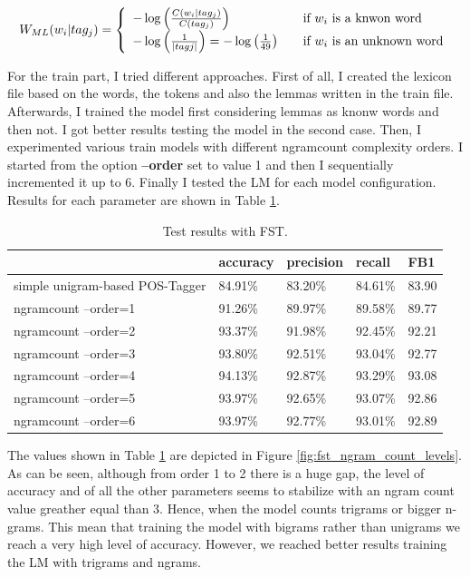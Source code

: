 \documentclass[a4paper,7pt,oneside]{book}
\begin{document}
\[ W_{ML}(w_i | tag_j) = \left\{ 
  \begin{array}{l l}
    - \log \left(\frac{C(w_i | tag_j)}{C(tag_j)}\right) & \quad \text{if $w_i$ is a knwon word}\\
    - \log \left(\frac{1}{|tagj|}\right) = - \log \left(\frac{1}{49}\right) & \quad \text{if $w_i$ is an unknown word}
  \end{array} \right.
 \]
\vspace{0.1cm}

\noindent
For the train part, I tried different approaches. First of all, I created the lexicon file based on the words, the tokens and also the lemmas written in the train file. Afterwards, I trained the model first considering lemmas as knonw words and then not. I got better results testing the model in the second case. Then, I experimented various train models with different ngramcount complexity orders. I started from the option \textbf{--order} set to value 1 and then I sequentially incremented it up to 6. Finally I tested the LM for each model configuration. Results for each parameter are shown in Table \ref{table:fst_results}.

\begin{table}[h!]
\small
	\begin{center}
	\begin{tabular}{|l|l|l|l|l|}
		\cline{2-5}
		\multicolumn{1}{r|}{} & accuracy & precision & recall & FB1 \\ \hline
		simple unigram-based POS-Tagger & 84.91\%  & 83.20\% &  84.61\% & 83.90 \\ \hline
		ngramcount --order=1 & 91.26\% & 89.97\% & 89.58\% & 89.77 \\ \hline
		ngramcount --order=2 & 93.37\% & 91.98\% & 92.45\% & 92.21 \\ \hline
		ngramcount --order=3 & 93.80\% & 92.51\% & 93.04\% & 92.77 \\ \hline \rowcolor{LightCyan}
		ngramcount --order=4 & 94.13\% & 92.87\% & 93.29\% & 93.08 \\ \hline
		ngramcount --order=5 & 93.97\% & 92.65\% & 93.07\% & 92.86 \\ \hline
		ngramcount --order=6 & 93.97\% & 92.77\% & 93.01\% & 92.89 \\ \hline
	\end{tabular}
	\caption{Test results with FST.}
	\label{table:fst_results}
	\end{center}
\end{table}

\noindent
The values shown in Table \ref{table:fst_results} are depicted in Figure \ref{fig:fst_ngram_count_levels}. As can be seen, although from order 1 to 2 there is a huge gap, the level of accuracy and of all the other parameters seems to stabilize with an ngram count value greather equal than 3. Hence, when the model counts trigrams or bigger n-grams. This mean that training the model with bigrams rather than unigrams we reach a very high level of accuracy. However, we reached better results training the LM with trigrams and ngrams.
\end{document}
